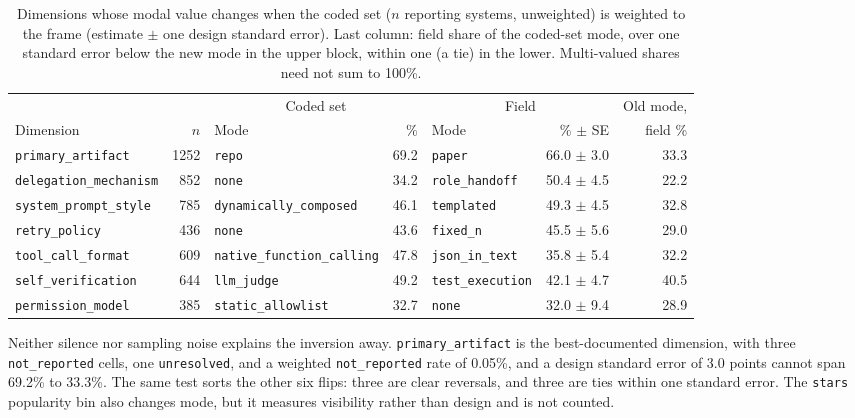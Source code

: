 \begin{table}[tbp]
\caption{Dimensions whose modal value changes when the coded set ($n$ reporting systems, unweighted) is
weighted to the frame (estimate $\pm$ one design standard error). Last column: field share of the
coded-set mode, over one standard error below the new mode in the upper block, within one (a tie) in the
lower. Multi-valued shares need not sum to 100\%.}
\label{tab:landscape_flips}
\footnotesize
\begin{tabular}{lrlrlrr}
\toprule
 & & \multicolumn{2}{c}{Coded set} & \multicolumn{2}{c}{Field} & Old mode, \\
\cmidrule(lr){3-4}\cmidrule(lr){5-6}
Dimension & $n$ & Mode & \% & Mode & \% $\pm$ SE & field \% \\
\midrule
\texttt{primary\_artifact}     & 1252 & \texttt{repo}                      & 69.2 & \texttt{paper}           & 66.0 $\pm$ 3.0 & 33.3 \\
\texttt{delegation\_mechanism} &  852 & \texttt{none}                      & 34.2 & \texttt{role\_handoff}   & 50.4 $\pm$ 4.5 & 22.2 \\
\texttt{system\_prompt\_style} &  785 & \texttt{dynamically\_composed}     & 46.1 & \texttt{templated}       & 49.3 $\pm$ 4.5 & 32.8 \\
\texttt{retry\_policy}         &  436 & \texttt{none}                      & 43.6 & \texttt{fixed\_n}        & 45.5 $\pm$ 5.6 & 29.0 \\
\midrule
\texttt{tool\_call\_format}    &  609 & \texttt{native\_function\_calling} & 47.8 & \texttt{json\_in\_text}  & 35.8 $\pm$ 5.4 & 32.2 \\
\texttt{self\_verification}    &  644 & \texttt{llm\_judge}                & 49.2 & \texttt{test\_execution} & 42.1 $\pm$ 4.7 & 40.5 \\
\texttt{permission\_model}     &  385 & \texttt{static\_allowlist}         & 32.7 & \texttt{none}            & 32.0 $\pm$ 9.4 & 28.9 \\
\bottomrule
\end{tabular}
\end{table}

Neither silence nor sampling noise explains the inversion away. \texttt{primary\_artifact} is the
best-documented dimension, with three \texttt{not\_reported} cells, one \texttt{unresolved}, and a
weighted \texttt{not\_reported} rate of 0.05\%, and a design standard error of 3.0 points cannot span
69.2\% to 33.3\%. The same test sorts the other six flips: three are clear reversals, and three are ties
within one standard error. The \texttt{stars} popularity bin also changes mode, but it measures
visibility rather than design and is not counted.

